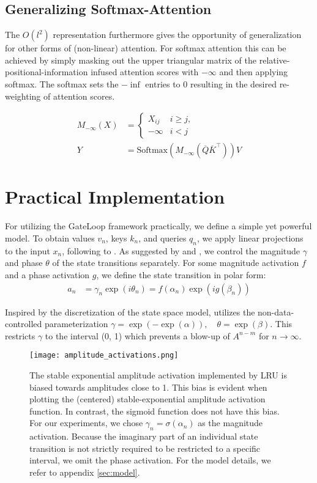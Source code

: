 \documentclass{article} \usepackage{iclr2024_conference,times}
\newcommand{\sigmoid}{\sigma}
\begin{document}
\subsection{Generalizing Softmax-Attention}
The $O(l^2)$ representation furthermore gives the opportunity of generalization for other forms of (non-linear) attention. For softmax attention this can be achieved by simply masking out the upper triangular matrix of the relative-positional-information infused attention scores with $-\infty$ and then applying softmax. The softmax sets the $-\inf$ entries to 0 resulting in the desired re-weighting of attention scores.

\begin{align}
M_{-\infty}(X) &= \begin{cases} 
  X_{ij} & i \geq j, \\
  -\infty & i < j 
\end{cases} \\[3pt]
Y &= \text{Softmax}(M_{-\infty}(\overline{Q} \overline{K}^\top))V
\end{align}

\section{Practical Implementation}\label{sec:practical}

For utilizing the GateLoop framework practically, we define a simple yet powerful model. To obtain values $v_n$, keys $k_n$, and queries $q_n$, we apply linear projections to the input $x_n$, following to \cite{vaswani2023attention}. As suggested by \cite{orvieto2023resurrecting} and \cite{sun2023retentive}, we control the magnitude $\gamma$ and phase $\theta$ of the state transitions separately. For some magnitude activation $f$ and a phase activation $g$, we define the state transition in polar form:
\begin{align}
    a_n &= \gamma_n \exp(i \theta_n) = f(\alpha_n) \exp(ig(\beta_n))
\end{align}

Inspired by the discretization of the state space model, \cite{orvieto2023resurrecting} utilizes the non-data-controlled parameterization $ \gamma = \exp(-\exp(\alpha)), \quad \theta = \exp(\beta)$. This restricts $\gamma$ to the interval (0, 1) which prevents a blow-up of $A^{n-m}$ for $n \to \infty$. 

\begin{figure}[H]
    \begin{center}
        \texttt{[image: amplitude\_activations.png]}
    \end{center}
    \caption{The stable exponential amplitude activation implemented by LRU is biased towards amplitudes close to 1. This bias is evident when plotting the (centered) stable-exponential amplitude activation function. In contrast, the sigmoid function does not have this bias. For our experiments, we chose $\gamma_n = \sigmoid(\alpha_n)$ as the magnitude activation. Because the imaginary part of an individual state transition is not strictly required to be restricted to a specific interval, we omit the phase activation. For the model details, we refer to appendix \ref{sec:model}.}
\end{figure}
\end{document}
